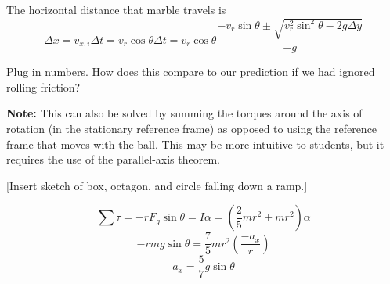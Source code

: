 The horizontal distance that marble travels is 
$$\Delta{x}=v_{x,i}\Delta{t}=v_r\cos\theta\Delta{t}=v_r\cos\theta\frac{-v_r\sin\theta\pm\sqrt{v_r^2\sin^2\theta-2g\Delta{y}}}{-g}$$

Plug in numbers. How does this compare to our prediction if we had ignored rolling friction?

\textbf{Note:} This can also be solved by summing the torques around the axis of rotation (in the stationary reference frame) as opposed to using the reference frame that moves with the ball. This may be more intuitive to students, but it requires the use of the parallel-axis theorem.

[Insert sketch of box, octagon, and circle falling down a ramp.]
\vspace{5cm}

$$\sum\tau = -rF_g\sin\theta = I\alpha = \left(\frac{2}{5}mr^2+mr^2\right)\alpha$$
$$ -rmg\sin\theta = \frac{7}{5}mr^2\left(\frac{-a_x}{r}\right)$$
$$\boxed{a_x=\frac{5}{7}g\sin\theta}$$


\clearpage
